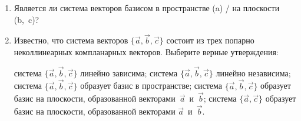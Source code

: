 \begin{enumerate}
    \item Является ли система векторов базисом в пространстве (a) / на плоскости (b,~c)?
    \begin{center}
    \end{center}
    \newpage
    \item Известно, что система векторов $\{\vec a, \vec b, \vec c\}$ состоит из трех попарно неколлинеарных компланарных векторов. Выберите верные утверждения:
    \begin{tasks}
        \task система $\{\vec a, \vec b, \vec c\}$ линейно зависима;
        \task система $\{\vec a, \vec b, \vec c\}$ линейно независима;
        \task система $\{\vec a, \vec b, \vec c\}$ образует базис в пространстве;
        \task система $\{\vec a, \vec b, \vec c\}$ образует базис на плоскости, образованной векторами~$\vec a$~и~$\vec b$;
        \task система $\{\vec a, \vec c\}$ образует базис на плоскости, образованной векторами $\vec a$~и~$\vec b$.
    \end{tasks}
    

\end{enumerate}
